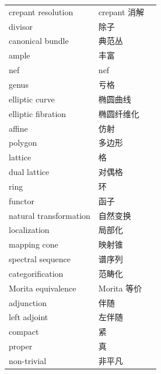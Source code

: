 {\begin{longtable}{p{5.0cm}p{5.6cm}p{3.6cm}}
crepant resolution & crepant 消解 &  \\
divisor & 除子 &  \\
canonical bundle & 典范丛 &  \\
ample & 丰富 &  \\
nef & nef &  \\
genus & 亏格 &  \\
elliptic curve & 椭圆曲线 &  \\
elliptic fibration & 椭圆纤维化 &  \\
affine & 仿射 &  \\
polygon & 多边形 &  \\
lattice & 格 &  \\
dual lattice & 对偶格 &  \\
ring & 环 &  \\
functor & 函子 &  \\
natural transformation & 自然变换 &  \\
localization & 局部化 &  \\
mapping cone & 映射锥 &  \\
spectral sequence & 谱序列 &  \\
categorification & 范畴化 &  \\
Morita equivalence & Morita 等价 &  \\
adjunction & 伴随 &  \\
left adjoint & 左伴随 &  \\
compact & 紧 &  \\
proper & 真 &  \\
non-trivial & 非平凡 &  \\
\end{longtable}
}
